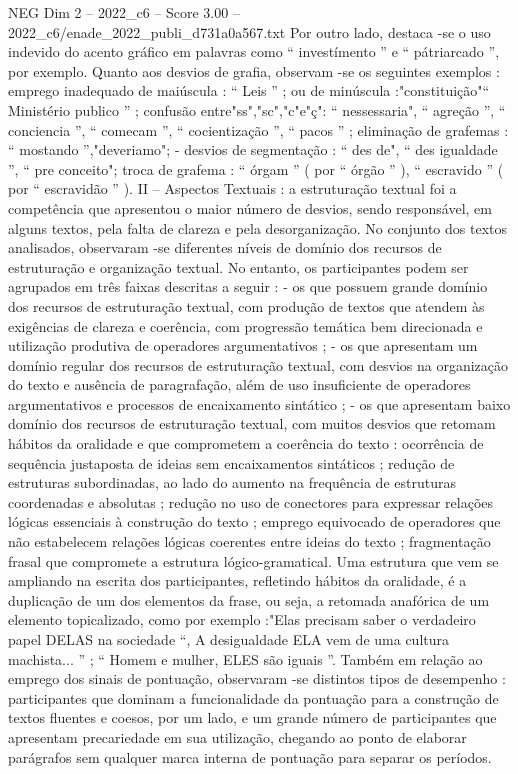 \begin{textsample}{NEG Dim 2 – 2022\_c6 – Score 3.00 – 2022\_c6/enade\_2022\_publi\_d731a0a567.txt}
Por outro lado, destaca -se o uso indevido do acento gráfico em palavras como “ investímento ” e “ pátriarcado ”, por exemplo.
Quanto aos desvios de grafia, observam -se os seguintes exemplos : emprego inadequado de maiúscula : “ Leis ” ; ou de minúscula :"constituição"“ Ministério publico ” ; confusão entre"ss","sc","c"e"ç": “ nessessaria", “ agreção ”, “ conciencia ”, “ comecam ”, “ cocientização ”, “ pacos ” ; eliminação de grafemas : “ mostando ”,"deveriamo"; - desvios de segmentação : “ des de", “ des igualdade ”, “ pre conceito"; troca de grafema : “ órgam ” ( por “ órgão ” ), “ escravido ” ( por “ escravidão ” ).
II – Aspectos Textuais : a estruturação textual foi a competência que apresentou o maior número de desvios, sendo responsável, em alguns textos, pela falta de clareza e pela desorganização.
No conjunto dos textos analisados, observaram -se diferentes níveis de domínio dos recursos de estruturação e organização textual.
No entanto, os participantes podem ser agrupados em três faixas descritas a seguir : - os que possuem grande domínio dos recursos de estruturação textual, com produção de textos que atendem às exigências de clareza e coerência, com progressão temática bem direcionada e utilização produtiva de operadores argumentativos ; - os que apresentam um domínio regular dos recursos de estruturação textual, com desvios na organização do texto e ausência de paragrafação, além de uso insuficiente de operadores argumentativos e processos de encaixamento sintático ; - os que apresentam baixo domínio dos recursos de estruturação textual, com muitos desvios que retomam hábitos da oralidade e que comprometem a coerência do texto : ocorrência de sequência justaposta de ideias sem encaixamentos sintáticos ; redução de estruturas subordinadas, ao lado do aumento na frequência de estruturas coordenadas e absolutas ; redução no uso de conectores para expressar relações lógicas essenciais à construção do texto ; emprego equivocado de operadores que não estabelecem relações lógicas coerentes entre ideias do texto ; fragmentação frasal que compromete a estrutura lógico-gramatical.
Uma estrutura que vem se ampliando na escrita dos participantes, refletindo hábitos da oralidade, é a duplicação de um dos elementos da frase, ou seja, a retomada anafórica de um elemento topicalizado, como por exemplo :"Elas precisam saber o verdadeiro papel DELAS na sociedade “, A desigualdade ELA vem de uma cultura machista... ” ; “ Homem e mulher, ELES são iguais ”.
Também em relação ao emprego dos sinais de pontuação, observaram -se distintos tipos de desempenho : participantes que dominam a funcionalidade da pontuação para a construção de textos fluentes e coesos, por um lado, e um grande número de participantes que apresentam precariedade em sua utilização, chegando ao ponto de elaborar parágrafos sem qualquer marca interna de pontuação para separar os períodos.

\end{textsample}
